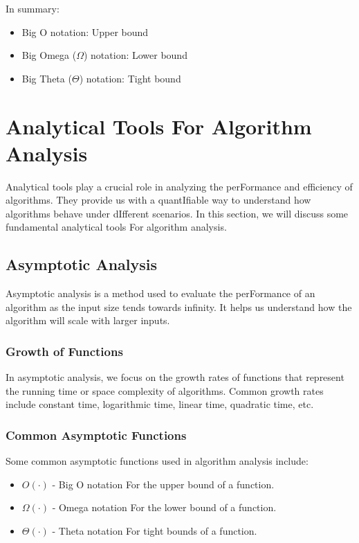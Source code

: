 \documentclass[12pt]{book} %
\begin{document}
In summary:
\begin{itemize}
    \item Big O notation: Upper bound
    \item Big Omega (\(\Omega\)) notation: Lower bound
    \item Big Theta (\(\Theta\)) notation: Tight bound
\end{itemize}

\section{Analytical Tools For Algorithm Analysis}

Analytical tools play a crucial role in analyzing the perFormance and efficiency of algorithms. They provide us with a quantIfiable way to understand how algorithms behave under dIfferent scenarios. In this section, we will discuss some fundamental analytical tools For algorithm analysis.

\subsection{Asymptotic Analysis}

Asymptotic analysis is a method used to evaluate the perFormance of an algorithm as the input size tends towards infinity. It helps us understand how the algorithm will scale with larger inputs.

\subsubsection{Growth of Functions}

In asymptotic analysis, we focus on the growth rates of functions that represent the running time or space complexity of algorithms. Common growth rates include constant time, logarithmic time, linear time, quadratic time, etc.

\subsubsection{Common Asymptotic Functions}

Some common asymptotic functions used in algorithm analysis include:
\begin{itemize}
  \item $O(\cdot)$ - Big O notation For the upper bound of a function.
  \item $\Omega(\cdot)$ - Omega notation For the lower bound of a function.
  \item $\Theta(\cdot)$ - Theta notation For tight bounds of a function.
\end{itemize}
\end{document}
